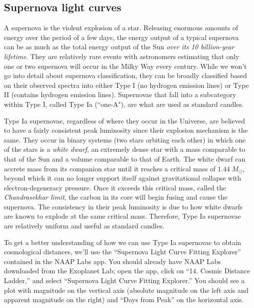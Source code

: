\documentclass[11pt]{article}
\begin{document}
\subsection{Supernova light curves}

A supernova is the violent explosion of a star. Releasing enormous amounts of energy over the period of a few days, the energy output of a typical supernova can be as much as the total energy output of the Sun \textsl{over its 10 billion-year lifetime}. They are relatively rare events with astronomers estimating that only one or two supernova will occur in the Milky Way every century. While we won't go into detail about supernova classification, they can be broadly classified based on their observed spectra into either Type I (no hydrogen emission lines) or Type II (contains hydrogen emission lines). Supernovae that fall into a subcategory within Type I, called Type Ia (``one-A"), are what are used as standard candles.

\medskip \noindent
Type Ia supernovae, regardless of where they occur in the Universe, are believed to have a fairly consistent peak luminosity since their explosion mechanism is the same. They occur in binary systems (two stars orbiting each other) in which one of the stars is a \textsl{white dwarf}, an extremely dense star with a mass comparable to that of the Sun and a volume comparable to that of Earth. The white dwarf can accrete mass from its companion star until it reaches a critical mass of $1.44\;M_\odot$, beyond which it can no longer support itself against gravitational collapse with electron-degeneracy pressure. Once it exceeds this critical mass, called the \textsl{Chandrasekhar limit}, the carbon in its core will begin fusing and cause the supernova. The consistency in their peak luminosity is due to how white dwarfs are known to explode at the same critical mass. Therefore, Type Ia supernovae are relatively uniform and useful as standard candles.

\medskip \noindent
To get a better understanding of how we can use Type Ia supernovae to obtain cosmological distances, we'll use the ``Supernova Light Curve Fitting Explorer'' contained in the NAAP Labs app. You should already have NAAP Labs downloaded from the Exoplanet Lab; open the app, click on ``14. Cosmic Distance Ladder,'' and select ``Supernova Light Curve Fitting Explorer.'' You should see a plot with magnitude on the vertical axis (absolute magnitude on the left axis and apparent magnitude on the right) and ``Days from Peak'' on the horizontal axis.
\end{document}
